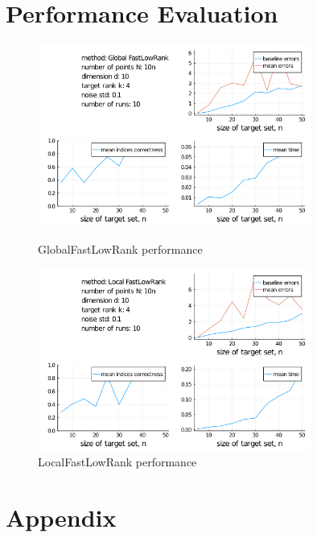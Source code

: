 \documentclass{article}
\begin{document}
\section{Performance Evaluation}
\begin{figure}[H]\label{img: FastLowRank performance}
    \includegraphics[width = 0.8\textwidth]{images/GlobalFastLowRank.png}
    \caption{GlobalFastLowRank performance}
    \includegraphics[width = 0.8\textwidth]{images/LocalFastLowRank.png}
    \caption{LocalFastLowRank performance}
\end{figure}


\printbibliography

\section{Appendix}
\end{document}
